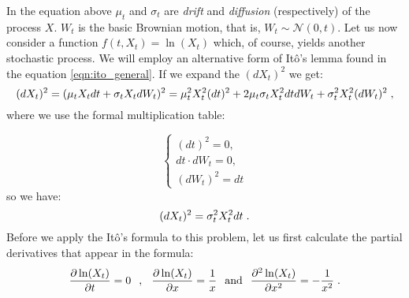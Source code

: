 \documentclass[times, utf8, diplomski]{fer}
\begin{document}
\noindent In the equation above $\mu_t$ and $\sigma_t$ are \textit{drift} and \textit{diffusion} (respectively) of the process $X$. $W_t$ is the basic Brownian motion, that is, $W_t \sim \mathcal{N}(0,t)$. Let us now consider a function $f(t,X_t) = \ln(X_t)$ which, of course, yields another stochastic process. We will employ an alternative form of It\^{o}'s lemma found in the equation \ref{eqn:ito_general}. If we expand the $(dX_t)^2$ we get: 
\begin{equation}
	(dX_t)^2 = (\mu_t X_t dt + \sigma_t X_t dW_t)^2 = \mu_t^2 X_t^2 (dt)^2 + 2\mu_t\sigma_tX_t^2dtdW_t + \sigma_t^2X_t^2(dW_t)^2 \hspace{0.1cm},
\end{equation}
where we use the formal multiplication table: 

\begin{equation} 
	\left\{ \begin{array}{c} (dt)^2 = 0, \\ dt\cdot dW_t = 0, \\ (dW_t)^2 = dt \end{array} \right. 
\end{equation} so we have: 
\begin{equation}
	(dX_t)^2 = \sigma_t^2X_t^2dt \hspace{0.1cm}.
\end{equation}
Before we apply the It\^{o}'s formula to this problem, let us first calculate the partial derivatives that appear in the formula:
\begin{equation}
	\frac{\partial \ln(X_t)}{\partial t} = 0 \hspace{0.25cm} , \hspace{0.25cm} \frac{\partial \ln(X_t)}{\partial x} = \frac{1}{x} \hspace{0.25cm} \mbox{and} \hspace{0.25cm} \frac{\partial^2 \ln(X_t)}{\partial x^2} = -\frac{1}{x^2} \hspace{0.1cm}.
\end{equation}
\end{document}
